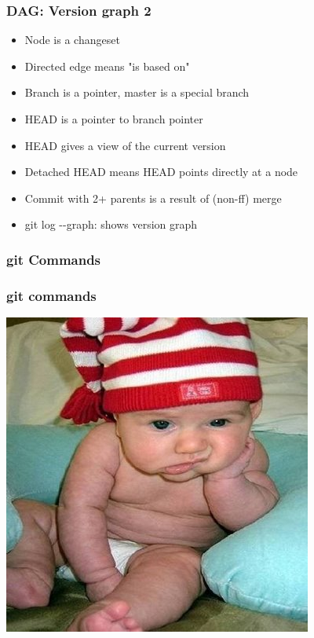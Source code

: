 \documentclass{beamer}
\begin{document}
		\begin{frame}
			\frametitle{DAG: Version graph 2}
			\begin{itemize}
        \item Node is a changeset
        \item Directed edge means "is based on"
        \item Branch is a pointer, master is a special branch
        \item HEAD is a pointer to branch pointer
        \item HEAD gives a view of the current version
        \item Detached HEAD means HEAD points directly at a node
        \item Commit with 2+ parents is a result of (non-ff) merge
        \item git log -{}-graph: shows version graph
			\end{itemize}
			\begin{center}
			\end{center}
		\end{frame}

		
		\subsubsection{git Commands}
		\begin{frame}
			\frametitle{git commands}
			\begin{center}
				\includegraphics[scale=.5]{images/commands}
			\end{center}
		\end{frame}
\end{document}
